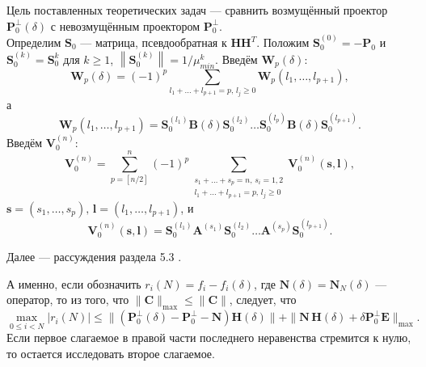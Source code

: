 \documentclass[fleqn]{article}
\newcommand\norm[1]{\left\|#1\right\|}
\begin{document}
	Цель поставленных теоретических задач --- сравнить возмущённый проектор $\mathbf{P}^\bot_0(\delta)$ с невозмущённым проектором $\mathbf{P}^\bot_0$.\\
	Определим $\mathbf{S}_0$ --- матрица, псевдообратная к $\mathbf{H}\mathbf{H}^T$. Положим $\mathbf{S}_0^{(0)} = -\mathbf{P}_0$ и $\mathbf{S}_0^{(k)}=\mathbf{S}_0^k$ для $k\geqslant1$, $\norm{\mathbf{S}_0^{(k)}}=1/\mu_{min}^k$. Введём $\mathbf{W}_p(\delta)$:
	\begin{equation*}
		\mathbf{W}_p(\delta) = (-1)^p\sum\limits_{l_1+\dots+l_{p+1}=p,\,l_j\geqslant0}\mathbf{W}_p(l_1,\dots,l_{p+1}),
	\end{equation*}
	а
	\begin{equation*}
		\mathbf{W}_p(l_1,\dots,l_{p+1}) = \mathbf{S}_0^{(l_1)}\mathbf{B}(\delta)\mathbf{S}_0^{(l_2)}\dots\mathbf{S}_0^{(l_p)}\mathbf{B}(\delta)\mathbf{S}_0^{(l_{p+1})}.
	\end{equation*}
	Введём $\mathbf{V}_0^{(n)}$:
	\begin{equation*}
		\mathbf{V}_0^{(n)}=\sum\limits_{p=[n/2]}^n(-1)^p\sum_{\substack{
				s_1+\dots+s_p=n,\,s_i=1,2\\
				l_1+\dots+l_{p+1}=p,\,l_j\geqslant0}}
		\mathbf{V}_0^{(n)}(\mathbf{s},\mathbf{l}),
	\end{equation*}
	$\mathbf{s} = (s_1,\dots,s_p),\,\mathbf{l}=(l_1,\dots,l_{p+1})$, и
	\begin{equation*}
		\mathbf{V}_0^{(n)}(\mathbf{s}, \mathbf{l})=\mathbf{S}_0^{(l_1)}\mathbf{A}^{(s_1)}\mathbf{S}_0^{(l_2)}\dots\mathbf{A}^{(s_p)}\mathbf{S}_0^{(l_{p+1})}.
	\end{equation*}

Далее --- рассуждения раздела 5.3 \cite{Nekrutkin10}.%
  
  А именно, если обозначить $r_i(N)=f_i-f_i(\delta)$, где $\mathbf{N}(\delta) = \mathbf{N}_N(\delta)$ --- оператор, то из того, что  $\|\mathbf{C}\|_{\max}\leq \|\mathbf{C}\|$, следует, что
 $$
 \max_{0\leq i<N} |r_i(N)|\leq \|(\mathbf{P}_0^\bot(\delta)- \mathbf{P}_0^\bot-\mathbf{N})\mathbf{H}(\delta)\| + \| \mathbf{N}\, \mathbf{H}(\delta) + \delta \mathbf{P}_0^\perp \mathbf{E}\|_{\max}.\label{eq:m_3}
  $$  %
 Если первое слагаемое в правой части последнего неравенства  стремится к нулю, то остается исследовать второе слагаемое.

\end{document}
